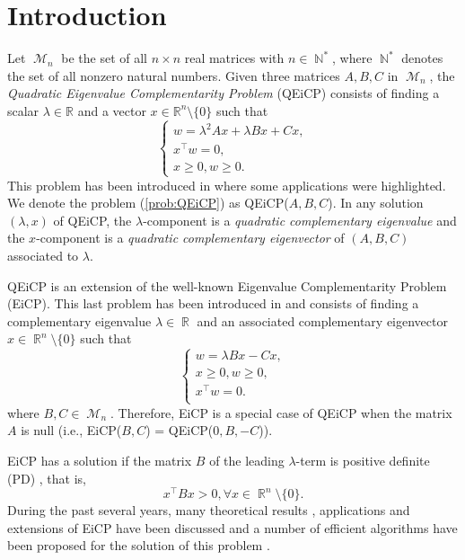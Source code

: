 \documentclass[3p]{elsarticle}
\DeclareMathOperator{\R}{\mathbb{R}}
\DeclareMathOperator{\N}{\mathbb{N}}
\DeclareMathOperator{\M}{\mathcal{M}}
\begin{document}

\section{Introduction}
Let $\M_n$ be the set of all $n\times n$ real matrices with $n\in \N^*$, where $\N^*$ denotes the set of all nonzero natural numbers. Given three matrices $A,B,C$ in $\M_n$, the \emph{Quadratic Eigenvalue Complementarity Problem} (QEiCP) consists of finding a scalar $\lambda \in \mathbb{R}$ and a vector $x\in \mathbb{R}^n\setminus\{0\}$ such that
\begin{equation}\label{prob:QEiCP}
\left\lbrace \begin{array}{l}
w=\lambda^2Ax+\lambda Bx+Cx,\\
x^{\top}w=0,\\
x\geq 0, w\geq 0.
\end{array}\right. 
\end{equation}
This problem has been introduced in \cite{Seeger11} where some applications were highlighted. We denote the problem (\ref{prob:QEiCP}) as QEiCP($A,B,C$). In any solution $(\lambda,x)$ of QEiCP, the $\lambda$-component is a \emph{quadratic complementary eigenvalue} and the $x$-component is a \emph{quadratic complementary eigenvector} of $(A,B,C)$ associated to $\lambda$.

QEiCP is an extension of the well-known Eigenvalue Complementarity Problem (EiCP). This last problem has been introduced in \cite{Seeger99} and consists of finding a complementary eigenvalue $\lambda\in \R$ and an associated complementary eigenvector $x\in \R^n\setminus\{0\}$ such that 
\begin{equation}\label{prob:EiCP}
\left\lbrace \begin{array}{l}
w=\lambda Bx-Cx,\\
x\geq 0, w\geq 0,\\
x^{\top}w=0.\\
\end{array}\right.
\end{equation}  
where $B,C\in \M_n$. Therefore, EiCP is a special case of QEiCP when the matrix $A$ is null (i.e., EiCP($B,C$) = QEiCP($0,B,-C$)). 

EiCP has a solution if the matrix $B$ of the leading $\lambda$-term is positive definite (PD) \cite{Seeger99,Judice09}, that is,
\begin{equation}
x^{\top} B x >0, \forall x\in \R^n\setminus\{0\}.
\end{equation} 
During the past several years, many theoretical results \cite{Seeger99,Judice09,Bras12,Costa10}, applications \cite{Costa04,Fernandes17,Patrascu15} and extensions \cite{Adly15,Chen16,Costa17,Fernandes16,Zhang18,Yihui09} of EiCP have been discussed and a number of efficient algorithms have been proposed for the solution of this problem \cite{Adly11,Bras17,Facchinei,Fernandes14,Iusem_inpress,Judice08,Lethi12,Niu12}. 
\end{document}
